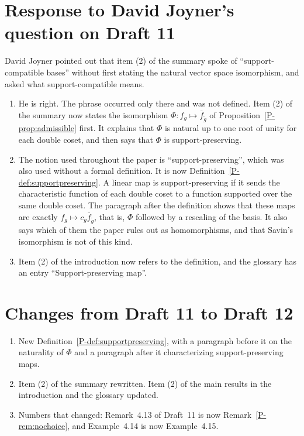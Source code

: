 \documentclass[12pt,letterpaper]{amsart}
\begin{document}
\section{Response to David Joyner's question on Draft 11}
\label{sec:d11request}

David Joyner pointed out that item (2) of the summary spoke of
``support-compatible bases'' without first stating the natural vector
space isomorphism, and asked what support-compatible means.

\begin{enumerate}[leftmargin=1.5em]
\item He is right. The phrase occurred only there and was not defined.
Item (2) of the summary now states the isomorphism
$\Phi:f_g\mapsto\overline f_{\tilde g}$ of
Proposition~\ref{P-prop:admissible} first. It explains that $\Phi$ is
natural up to one root of unity for each double coset, and then says
that $\Phi$ is support-preserving.
\item The notion used throughout the paper is ``support-preserving'',
which was also used without a formal definition. It is now
Definition~\ref{P-def:supportpreserving}. A linear map is
support-preserving if it sends the characteristic function of each
double coset to a function supported over the same double coset. The
paragraph after the definition shows that these maps are exactly
$f_g\mapsto c_g\overline f_{\tilde g}$, that is, $\Phi$ followed by a
rescaling of the basis. It also says which of them the paper rules out
as homomorphisms, and that Savin's isomorphism is not of this kind.
\item Item (2) of the introduction now refers to the definition, and
the glossary has an entry ``Support-preserving map''.
\end{enumerate}

\section{Changes from Draft 11 to Draft 12}
\label{sec:d11d12}

\begin{enumerate}[leftmargin=1.5em]
\item New Definition~\ref{P-def:supportpreserving}, with a paragraph
before it on the naturality of $\Phi$ and a paragraph after it
characterizing support-preserving maps.
\item Item (2) of the summary rewritten. Item (2) of the main results in
the introduction and the glossary updated.
\item Numbers that changed: Remark~4.13 of Draft~11 is now
Remark~\ref{P-rem:nochoice}, and Example~4.14 is now Example~4.15.
\end{enumerate}
\end{document}
